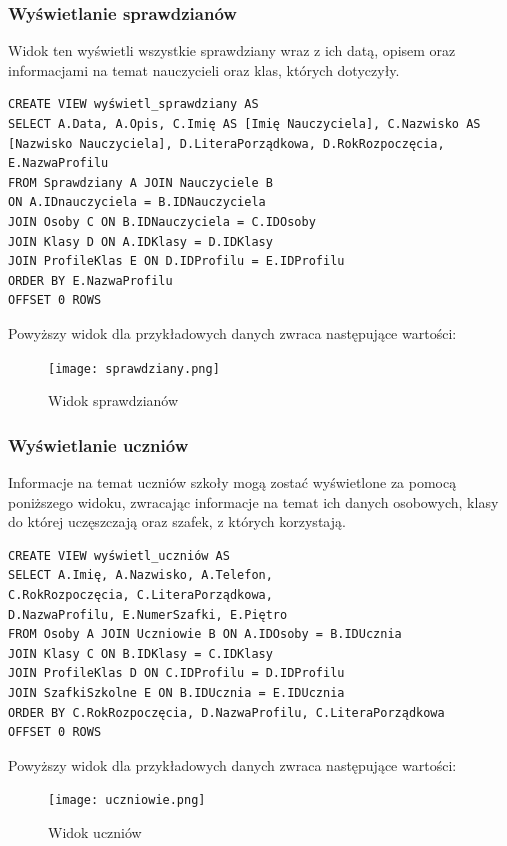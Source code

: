 \documentclass[60pt]{article}
\begin{document}
\subsubsection{Wyświetlanie sprawdzianów}

Widok ten wyświetli wszystkie sprawdziany wraz z ich datą, opisem oraz informacjami na temat nauczycieli oraz klas, których dotyczyły.

\begin{verbatim}
CREATE VIEW wyświetl_sprawdziany AS
SELECT A.Data, A.Opis, C.Imię AS [Imię Nauczyciela], C.Nazwisko AS [Nazwisko Nauczyciela], D.LiteraPorządkowa, D.RokRozpoczęcia, E.NazwaProfilu
FROM Sprawdziany A JOIN Nauczyciele B
ON A.IDnauczyciela = B.IDNauczyciela
JOIN Osoby C ON B.IDNauczyciela = C.IDOsoby
JOIN Klasy D ON A.IDKlasy = D.IDKlasy
JOIN ProfileKlas E ON D.IDProfilu = E.IDProfilu
ORDER BY E.NazwaProfilu
OFFSET 0 ROWS
\end{verbatim}

Powyższy widok dla przykładowych danych zwraca następujące wartości:

\begin{figure}[h]
  \texttt{[image: sprawdziany.png]}
  \caption{Widok sprawdzianów}
  \label{Widok sprawdzianów}
\end{figure}

\subsubsection{Wyświetlanie uczniów}

Informacje na temat uczniów szkoły mogą zostać wyświetlone za pomocą poniższego widoku, zwracając informacje na temat ich danych osobowych, klasy do której uczęszczają oraz szafek, z których korzystają.

\begin{verbatim}
CREATE VIEW wyświetl_uczniów AS
SELECT A.Imię, A.Nazwisko, A.Telefon, 
C.RokRozpoczęcia, C.LiteraPorządkowa, 
D.NazwaProfilu, E.NumerSzafki, E.Piętro
FROM Osoby A JOIN Uczniowie B ON A.IDOsoby = B.IDUcznia
JOIN Klasy C ON B.IDKlasy = C.IDKlasy
JOIN ProfileKlas D ON C.IDProfilu = D.IDProfilu
JOIN SzafkiSzkolne E ON B.IDUcznia = E.IDUcznia
ORDER BY C.RokRozpoczęcia, D.NazwaProfilu, C.LiteraPorządkowa
OFFSET 0 ROWS
\end{verbatim}

Powyższy widok dla przykładowych danych zwraca następujące wartości:

\begin{figure}[h]
  \texttt{[image: uczniowie.png]}
  \caption{Widok uczniów}
  \label{Widok uczniów}
\end{figure}
\end{document}
